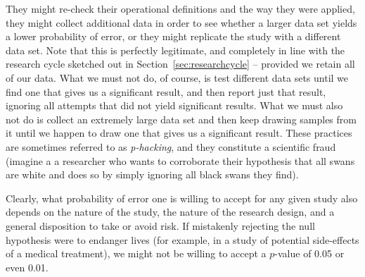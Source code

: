 They might re\hyp{}check their operational  definitions and the way they were applied, they might collect additional data in order to see whether a larger data set yields a lower probability  of error, or they might replicate  the study with a different data set. Note that this is perfectly legitimate, and completely in line with the research cycle sketched out in Section~\ref{sec:researchcycle} -- provided we retain all of our data. What we must not do, of course, is test different data sets until we find one that gives us a significant  result, and then report just that result, ignoring all attempts that did not yield significant results. What we must also not do is collect an extremely large  data set and then keep drawing samples  from it until we happen to draw one that gives us a significant result. These practices are sometimes referred to as \textit{p\hyp{}hacking}, and they constitute a scientific fraud (imagine a a researcher who wants to corroborate  their hypothesis that all swans are white and does so by simply ignoring all black swans they find).

Clearly, what probability  of error one is willing to accept for any given study also depends on the nature of the study, the nature of the research design,  and a general disposition to take or avoid risk. If mistakenly rejecting the null hypothesis  were to endanger lives (for example, in a study of potential side\hyp{}effects of a medical treatment), we might not be willing to accept a $p$\hyp{}value  of 0.05 or even 0.01.

